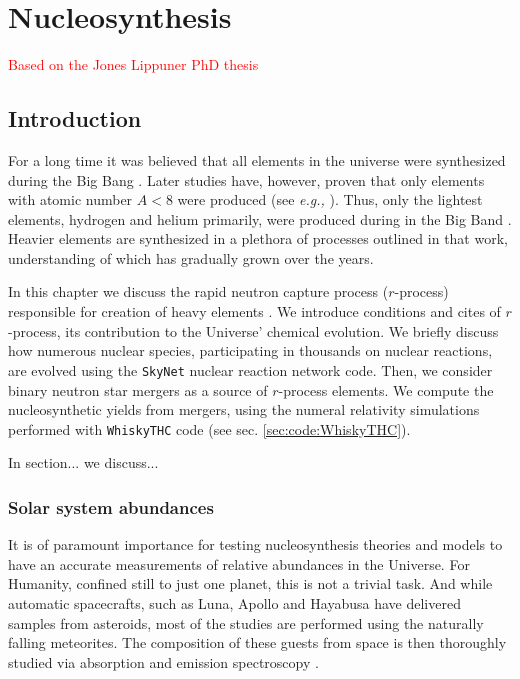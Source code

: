 \documentclass[11pt,a4paper,headinclude=true,DIV=14,BCOR=8mm,chapterprefix,listof=totoc,twoside,openright,abstracton]{scrbook}
\begin{document}
\chapter{Nucleosynthesis}
\textcolor{red}{Based on the Jones Lippuner PhD thesis}


\section{Introduction}

For a long time it was believed that all elements in the universe were synthesized during the Big Bang \cite{Alpher:1948}. Later studies have, however, proven that only elements with atomic number $A<8$ were produced (see \textit{e.g.,} \cite{Alpher:1950,Shaviv:2012}). Thus, only the lightest elements, hydrogen and helium primarily, were produced during in the Big Band \cite{Burbidge:1957}. Heavier elements are synthesized in a plethora of processes outlined in that work, understanding of which has gradually grown over the years. 

In this chapter we discuss the rapid neutron capture process ($r$-process) responsible for creation of heavy elements \cite{Burbidge:1957}. We introduce conditions and cites of $r$-process, its contribution to the Universe' chemical evolution. We briefly discuss how numerous nuclear species, participating in thousands on nuclear reactions, are evolved using the \texttt{SkyNet} nuclear reaction network code. Then, we consider binary neutron star mergers as a source of $r$-process elements. We compute the nucleosynthetic yields from mergers, using the numeral relativity simulations performed with \texttt{WhiskyTHC} code (see sec. \ref{sec:code:WhiskyTHC}). 

In section... we discuss...


\subsection{Solar system abundances}

It is of paramount importance for testing nucleosynthesis theories and models to have an accurate measurements of relative abundances in the Universe. For Humanity, confined still to just one planet, this is not a trivial task. And while automatic spacecrafts, such as Luna, Apollo and Hayabusa have delivered samples from asteroids, most of the studies are performed using the naturally falling meteorites. The composition of these guests from space is then thoroughly studied via absorption and emission spectroscopy \cite{Shaviv:2012}.
\end{document}
